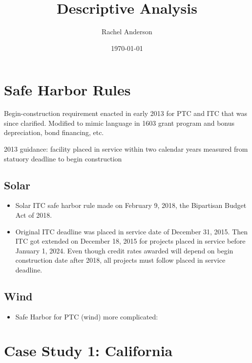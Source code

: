 \documentclass[11pt, oneside]{article}   	%
\title{Descriptive Analysis}
\author{Rachel Anderson}
\date{\today}							%
\begin{document}
\maketitle

\section{Safe Harbor Rules}

Begin-construction requirement enacted in early 2013 for PTC and ITC that was since clarified.  Modified to mimic language in 1603 grant program and bonus depreciation, bond financing, etc. 

2013 guidance:  facility placed in service within two calendar years measured from statuory deadline to begin construction

\subsection{Solar}
\begin{itemize}
\item Solar ITC safe harbor rule made on February 9, 2018, the Bipartisan Budget Act of 2018.   
\item Original ITC deadline was placed in service date of December 31, 2015. Then ITC got extended on December 18, 2015 for projects placed in service before January 1, 2024.  Even though credit rates awarded will depend on begin construction date after 2018, all projects must follow placed in service deadline.  
\end{itemize}
\subsection{Wind}
\begin{itemize}
\item Safe Harbor for PTC (wind) more complicated:
\end{itemize}



\section{Case Study 1: California}
\end{document}
